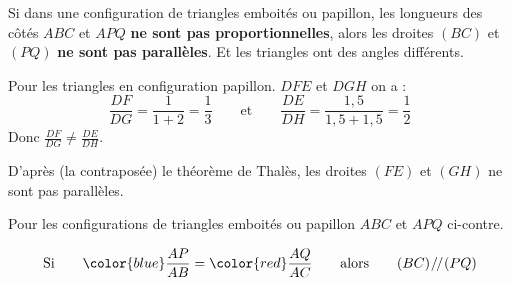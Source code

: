 \documentclass[main.tex]{subfiles}
\begin{document}
\begin{theorem}
	Si dans une configuration de triangles emboités ou papillon, les longueurs des côtés $ABC$ et $APQ$ \textbf{ne sont pas proportionnelles}, alors les droites $(BC)$ et $(PQ)$  \textbf{ne sont pas parallèles}.  Et les triangles ont des angles différents.
\end{theorem} 
\begin{example}    
	Pour les triangles en configuration papillon. $DFE$ et $DGH$ on a :
	$$
	\frac{DF}{DG} = \frac{1}{1+2}=\frac{1}{3}
	\qquad \text{et}\qquad 
	\frac{DE}{DH} = \frac{1,5}{1,5+1,5}=\frac{1}{2}
	$$
	Donc $\frac{DF}{DG} \neq \frac{DE}{DH}$.
	
	D'après (la contraposée) le théorème de Thalès, les droites $(FE)$ et $(GH)$ ne sont pas parallèles. 
\end{example}  
\newpage 
\begin{theorem}
	
	Pour les configurations de triangles emboités ou papillon $ABC$ et $APQ$ ci-contre. 
	
	$$\text{Si} \qquad { 
		{\color{blue}\frac{AP}{AB}}={\color{red}\frac{AQ}{AC}}  
	}
	\qquad \text{alors} \qquad    (BC) \mathbin{\!/\mkern-2mu/\!}  (PQ) $$
\end{theorem}
\end{document}
